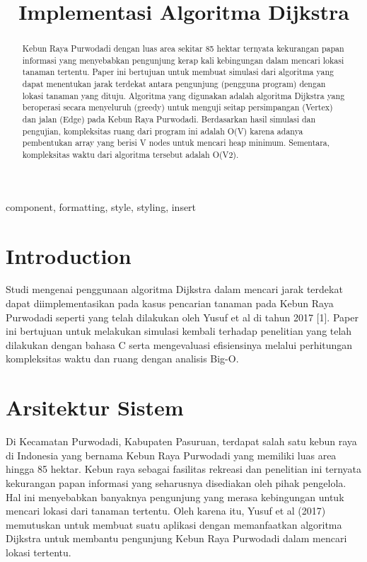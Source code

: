 \documentclass[conference]{IEEEtran}
\title{Implementasi Algoritma Dijkstra}
\author{
\IEEEauthorblockN{Eraraya Morenzo Muten}
\IEEEauthorblockA{\textit{School of Electrical Engineering and Informatics}\\
\textit{Institut Teknologi Bandung}\\
Bandung, Indonesia\\
Emaill: 18320003@std.stei.itb.ac.id}
}
\begin{document}
\maketitle

\begin{abstract}
    Kebun Raya Purwodadi dengan luas area sekitar 85
hektar ternyata kekurangan papan informasi yang menyebabkan
pengunjung kerap kali kebingungan dalam mencari lokasi tanaman
tertentu. Paper ini bertujuan untuk membuat simulasi
dari algoritma yang dapat menentukan jarak terdekat antara
pengunjung (pengguna program) dengan lokasi tanaman yang
dituju. Algoritma yang digunakan adalah algoritma Dijkstra
yang beroperasi secara menyeluruh (greedy) untuk menguji
seitap persimpangan (Vertex) dan jalan (Edge) pada Kebun
Raya Purwodadi. Berdasarkan hasil simulasi dan pengujian,
kompleksitas ruang dari program ini adalah O(V) karena adanya
pembentukan array yang berisi V nodes untuk mencari heap minimum.
Sementara, kompleksitas waktu dari algoritma tersebut
adalah O(V2).
\end{abstract}

\begin{IEEEkeywords}
    component, formatting, style, styling, insert
\end{IEEEkeywords}

\section{Introduction}
Studi mengenai penggunaan algoritma Dijkstra dalam mencari
jarak terdekat dapat diimplementasikan pada kasus pencarian
tanaman pada Kebun Raya Purwodadi seperti yang telah
dilakukan oleh Yusuf et al di tahun 2017 [1]. Paper ini bertujuan
untuk melakukan simulasi kembali terhadap penelitian
yang telah dilakukan dengan bahasa C serta mengevaluasi
efisiensinya melalui perhitungan kompleksitas waktu dan ruang
dengan analisis Big-O.

\section{Arsitektur Sistem}
Di Kecamatan Purwodadi, Kabupaten Pasuruan, terdapat
salah satu kebun raya di Indonesia yang bernama Kebun
Raya Purwodadi yang memiliki luas area hingga 85 hektar.
Kebun raya sebagai fasilitas rekreasi dan penelitian ini ternyata
kekurangan papan informasi yang seharusnya disediakan oleh
pihak pengelola. Hal ini menyebabkan banyaknya pengunjung
yang merasa kebingungan untuk mencari lokasi dari tanaman
tertentu. Oleh karena itu, Yusuf et al (2017) memutuskan
untuk membuat suatu aplikasi dengan memanfaatkan algoritma
Dijkstra untuk membantu pengunjung Kebun Raya Purwodadi
dalam mencari lokasi tertentu.
\end{document}
